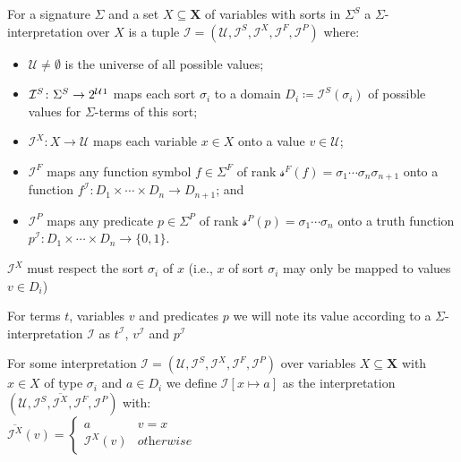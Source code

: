 \begin{definition}
For a signature $\Sigma$ and a set $X\subseteq\mathbf{X}$ of variables with sorts in $\Sigma^S$ a $\Sigma$-interpretation over $X$ is a tuple
$\mathcal{I}=\left(\mathcal{U},\mathcal{I}^S, \mathcal{I}^X, \mathcal{I}^F, \mathcal{I}^P\right)$
where:
\begin{itemize}
    \item $\mathcal{U}\neq\emptyset$ is the universe of all possible values;
    \item $\mathcal{I}^S\colon\Sigma^S\to2^\mathcal{U}\footnotemark$ 
        maps each sort $\sigma_i$ to a domain $D_i\coloneqq\mathcal{I}^S\left(\sigma_i\right)$ of possible values for $\Sigma$-terms of this sort;
    \item $\mathcal{I}^X\colon X\to \mathcal{U}$ maps each variable $x\in X$ onto a value $v\in\mathcal{U}$;
    \item $\mathcal{I}^F$ maps any function symbol $f\in\Sigma^F$ of rank  $\mathcal{s}^F\left(f\right)=\sigma_1\dotsi\sigma_n\sigma_{n+1}$ onto a function $f^\mathcal{I}\colon D_1\times\dotsi\times D_n \to D_{n+1}$; and
    \item $\mathcal{I}^P$ maps any predicate $p\in\Sigma^P$ of rank $\mathcal{s}^P\left(p\right)=\sigma_1\dotsi\sigma_n$ onto a truth function $p^\mathcal{I}\colon D_1\times\dotsi\times D_n \to \{0,1\}$.
\end{itemize}
$\mathcal{I}^X$ must respect the sort $\sigma_i$ of $x$ (i.e., $x$ of sort $\sigma_i$ may only be mapped to values $v\in D_i$)
\end{definition}
For terms $t$, variables $v$ and predicates $p$ we will note its value according to a $\Sigma$-interpretation $\mathcal{I}$ as $t^\mathcal{I}$, $v^\mathcal{I}$ and $p^\mathcal{I}$

\begin{definition}[Substitution]
For some interpretation $\mathcal{I}=\left(\mathcal{U},\mathcal{I}^S, \mathcal{I}^X, \mathcal{I}^F, \mathcal{I}^P\right)$ over variables $X\subseteq\mathbf{X}$ with $x\in X$ of type $\sigma_i$ and $a\in D_i$ we define $\mathcal{I}\left[x\mapsto a\right]$ as the interpretation $\left(\mathcal{U},\mathcal{I}^S, \overline{\mathcal{I}^X}, \mathcal{I}^F, \mathcal{I}^P\right)$ with:\\
$\overline{\mathcal{I}^X}(v)=
\begin{cases}
a & v=x\\
\mathcal{I}^X(v) & \textit{otherwise}
\end{cases}$
\end{definition}

